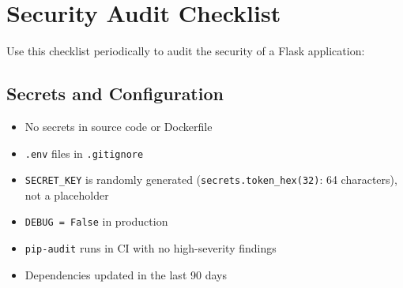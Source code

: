 \begin{codebox}[short]

\begin{Shaded}
\begin{Highlighting}[]
\OperatorTok{\textless{}}\OperatorTok{\textgreater{}}\OperatorTok{\textless{}/}\OperatorTok{\textgreater{}}

\OperatorTok{\textless{}}\OperatorTok{\textgreater{}}\OperatorTok{|}\OperatorTok{\textless{}/}\OperatorTok{\textgreater{}}
\end{Highlighting}
\end{Shaded}

\end{codebox}

\setcounter{section}{8}
\section{Security Audit Checklist}\label{38-security:389-security-audit-checklist}

Use this checklist periodically to audit the security of a Flask application:

\subsection*{Secrets and Configuration}\label{38-security:secrets-and-configuration}

\begin{itemize}
\tightlist
\item[$\square$]
  No secrets in source code or Dockerfile
\item[$\square$]
  \texttt{.env} files in \texttt{.gitignore}
\item[$\square$]
  \texttt{SECRET\_KEY} is randomly generated (\texttt{secrets.token\_hex(32)}: 64 characters), not a placeholder
\item[$\square$]
  \texttt{DEBUG\ =\ False} in production
\item[$\square$]
  \texttt{pip-audit} runs in CI with no high-severity findings
\item[$\square$]
  Dependencies updated in the last 90 days
\end{itemize}


